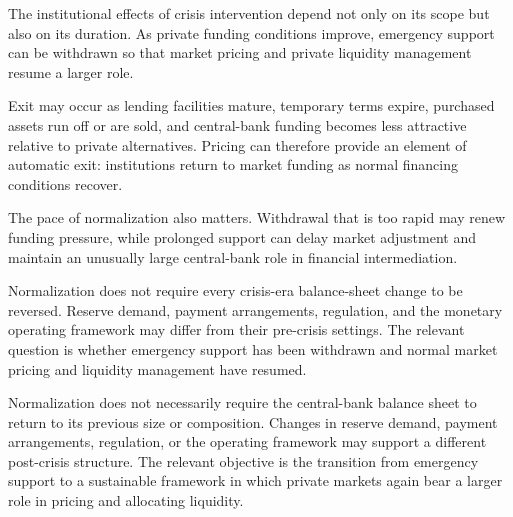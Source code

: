 The institutional effects of crisis intervention depend not only on its scope but also on its duration. As private funding conditions improve, emergency support can be withdrawn so that market pricing and private liquidity management resume a larger role.

Exit may occur as lending facilities mature, temporary terms expire, purchased assets run off or are sold, and central-bank funding becomes less attractive relative to private alternatives. Pricing can therefore provide an element of automatic exit: institutions return to market funding as normal financing conditions recover.

The pace of normalization also matters. Withdrawal that is too rapid may renew funding pressure, while prolonged support can delay market adjustment and maintain an unusually large central-bank role in financial intermediation.

\begin{tcolorbox}[
enhanced,
breakable,
colback=white,
colframe=FinanceBlue,
boxrule=0.7pt,
sharp corners,
borderline west={2.2pt}{0pt}{FinanceBlue},
title=\textbf{Financial Perspective: Normalization Is Not Simply Balance-Sheet Reversal},
coltitle=white,
colbacktitle=FinanceBlue,
fonttitle=\bfseries,
before skip=1.2em,
after skip=1.2em
]

Normalization does not require every crisis-era balance-sheet change to be reversed. Reserve demand, payment arrangements, regulation, and the monetary operating framework may differ from their pre-crisis settings. The relevant question is whether emergency support has been withdrawn and normal market pricing and liquidity management have resumed.

\end{tcolorbox}


Normalization does not necessarily require the central-bank balance sheet to return to its previous size or composition. Changes in reserve demand, payment arrangements, regulation, or the operating framework may support a different post-crisis structure. The relevant objective is the transition from emergency support to a sustainable framework in which private markets again bear a larger role in pricing and allocating liquidity.





